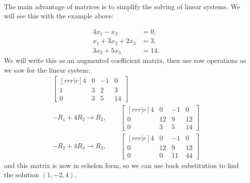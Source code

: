 ~
\phantom{Here's some text}

The main advantage of matrices is to simplify the solving of linear systems.   We will see this with the example above:

\begin{align*}
4x_1 - x_3 & = 0, \\
x_1+3x_2 +2x_3 & = 3, \\
3x_2 + 5x_3 & = 14. 
\end{align*}
We will write this as an augmented coefficient matrix, then use row operations as we saw for the linear system:
%
\begin{align*}
\begin{bmatrix}[rrr|r]
4 & 0 & -1 & 0 \\
1 & 3 & 2 & 3 \\
0 & 3 & 5 & 14 
\end{bmatrix} \\
-R_1 + 4R_2 \rightarrow R_2,  \qquad
\begin{bmatrix}[rrr|r]
4 & 0 & -1 & 0 \\
0 & 12 & 9 & 12 \\
0 & 3 & 5 & 14 
\end{bmatrix} \\
-R_2 + 4R_3 \rightarrow R_3, \qquad
\begin{bmatrix}[rrr|r]
4 & 0 & -1 & 0 \\
0 & 12 & 9 & 12 \\
0 & 0 & 11 & 44 
\end{bmatrix} 
\end{align*}
and this matrix is now in echelon form, so we can use back substitution to find the solution $(1,-2,4)$.  

